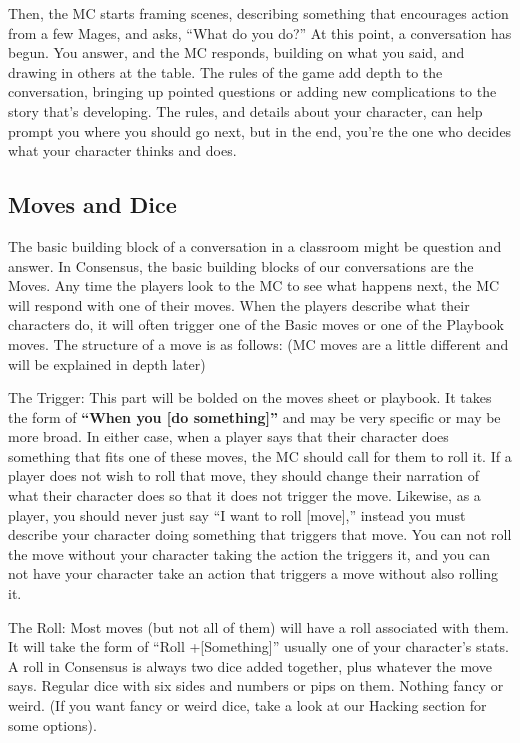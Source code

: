 \documentclass[
]{article}
\begin{document}
Then, the MC starts framing scenes, describing something that encourages
action from a few Mages, and asks, ``What do you do?'' At this point, a
conversation has begun. You answer, and the MC responds, building on
what you said, and drawing in others at the table. The rules of the game
add depth to the conversation, bringing up pointed questions or adding
new complications to the story that's developing. The rules, and details
about your character, can help prompt you where you should go next, but
in the end, you're the one who decides what your character thinks and
does.

\hypertarget{moves-and-dice}{%
\subsection{Moves and Dice}\label{moves-and-dice}}

The basic building block of a conversation in a classroom might be
question and answer. In Consensus, the basic building blocks of our
conversations are the Moves. Any time the players look to the MC to see
what happens next, the MC will respond with one of their moves. When the
players describe what their characters do, it will often trigger one of
the Basic moves or one of the Playbook moves. The structure of a move is
as follows: (MC moves are a little different and will be explained in
depth later)

The Trigger: This part will be bolded on the moves sheet or playbook. It
takes the form of \textbf{``When you {[}do something{]}''} and may be
very specific or may be more broad. In either case, when a player says
that their character does something that fits one of these moves, the MC
should call for them to roll it. If a player does not wish to roll that
move, they should change their narration of what their character does so
that it does not trigger the move. Likewise, as a player, you should
never just say ``I want to roll {[}move{]},'' instead you must describe
your character doing something that triggers that move. You can not roll
the move without your character taking the action the triggers it, and
you can not have your character take an action that triggers a move
without also rolling it.

The Roll: Most moves (but not all of them) will have a roll associated
with them. It will take the form of ``Roll +{[}Something{]}'' usually
one of your character's stats. A roll in Consensus is always two dice
added together, plus whatever the move says. Regular dice with six sides
and numbers or pips on them. Nothing fancy or weird. (If you want fancy
or weird dice, take a look at our Hacking section for some options).
\end{document}
